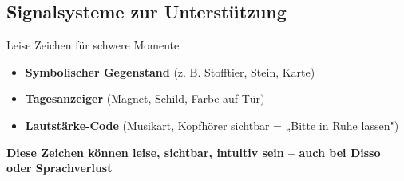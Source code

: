 \subsection*{\textcolor{ctmmOrange}{Signalsysteme zur Unterstützung}}

\begin{ctmmOrangeBox}{Leise Zeichen für schwere Momente}
\begin{itemize}
  \item \textbf{Symbolischer Gegenstand} (z. B. Stofftier, Stein, Karte)
  \item \textbf{Tagesanzeiger} (Magnet, Schild, Farbe auf Tür)
  \item \textbf{Lautstärke-Code} (Musikart, Kopfhörer sichtbar = „Bitte in Ruhe lassen")
\end{itemize}

\textbf{Diese Zeichen können leise, sichtbar, intuitiv sein -- auch bei Disso oder Sprachverlust}
\end{ctmmOrangeBox}
